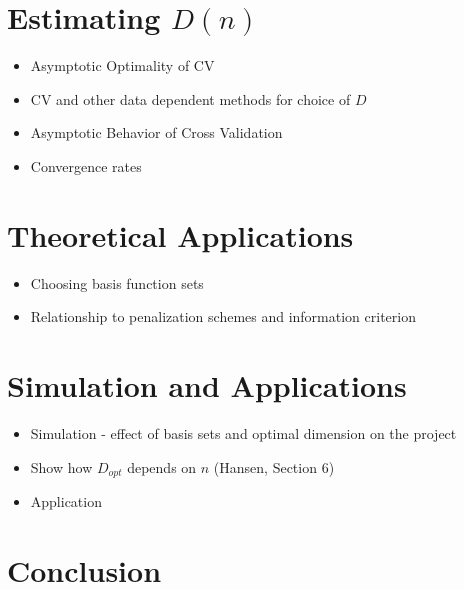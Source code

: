 \documentclass[12pt]{article}  %
\begin{document}
\section{Estimating $D(n)$}

\begin{itemize}
\item Asymptotic Optimality of CV
\item CV and other data dependent methods for choice of $D$
\item Asymptotic Behavior of Cross Validation 
\item Convergence rates
\end{itemize}

\section{Theoretical Applications}
\begin{itemize}
\item Choosing basis function sets 
\item Relationship to penalization schemes and information criterion
\end{itemize}

\section{Simulation and Applications}

\begin{itemize}
\item Simulation - effect of basis sets and optimal dimension on the project 
\item Show how $D_{opt}$ depends on $n$ (Hansen, Section 6)
\item Application 
\end{itemize}


\section{Conclusion}
\end{document}
